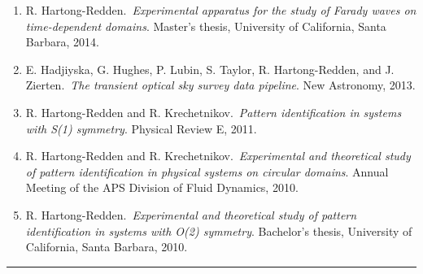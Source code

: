 \documentclass[10pt,letterpaper]{article}
\newenvironment{indentsection}[1]%
{\begin{list}{}%
	{\setlength{\leftmargin}{#1}}%
	\item[]%
}
{\end{list}}
\begin{document}
\begin{indentsection}{\parindent}
\begin{enumerate}
	\item R. Hartong-Redden.~\emph{Experimental apparatus for the study of Farady waves on time-dependent domains}. Master's thesis, University of California, Santa Barbara, 2014.
	\item E. Hadjiyska, G. Hughes, P. Lubin, S. Taylor, R. Hartong-Redden, and J. Zierten.~\emph{The transient optical sky survey data pipeline}. New Astronomy, 2013.
	\item R. Hartong-Redden and R. Krechetnikov.~{\em Pattern identification in systems with S(1) symmetry}. Physical Review E, 2011.
	\item R. Hartong-Redden and R. Krechetnikov.~{\em Experimental and theoretical study of pattern identification in physical systems on circular domains}. Annual Meeting of the APS Division of Fluid Dynamics, 2010.
	\item R. Hartong-Redden.~{\em Experimental and theoretical study of pattern identification in systems with O(2) symmetry}. Bachelor's thesis, University of California, Santa Barbara, 2010.

\end{enumerate}
\end{indentsection}
\hrule
\end{document}
